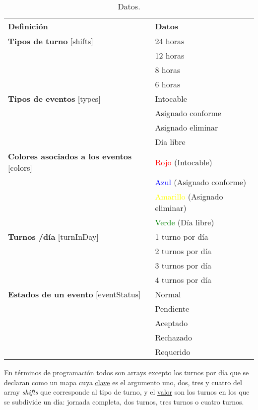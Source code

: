 \begin{itemize}
	\begin{table}[htbp]
\begin{center}
\begin{tabular}{|l|l|}
\hline
Definición & Datos  \\
\hline \hline
\textbf{Tipos de turno} [shifts] &  24 horas \\ \hline
 &  12 horas \\ \hline
 &  8 horas\\ \hline
 &  6 horas\\ \hline
  \textbf{Tipos de eventos}  [types] & Intocable \\ \hline
 &  Asignado conforme \\ \hline
 &  Asignado eliminar \\ \hline
 &  Día libre\\ \hline
  \textbf{Colores asociados a los eventos} [colors] & \textcolor{red}{Rojo} \small{(Intocable)} \\ \hline
 &  \textcolor{blue}{Azul} \small{(Asignado conforme)} \\ \hline
 &  \textcolor{yellow}{Amarillo} \small{(Asignado eliminar)} \\ \hline
 &  \textcolor{green}{Verde} \small{(Día libre)} \\ \hline
  \textbf{Turnos /día} [turnInDay] & 1 turno por día \\ \hline
 & 2 turnos por día  \\ \hline
 & 3 turnos por día  \\ \hline
 & 4 turnos por día  \\ \hline
   \textbf{Estados de un evento} [eventStatus] & Normal \\ \hline
 & Pendiente  \\ \hline
 & Aceptado   \\ \hline
 & Rechazado  \\ \hline
  & Requerido  \\ \hline
\end{tabular}
\caption{Datos.}
\label{tabla:sencilla}
\end{center}
\end{table}

En términos de programación todos son arrays excepto los turnos por día que se declaran como un mapa cuya \underline{clave} es el argumento uno, dos, tres y cuatro del array \emph{shifts} que corresponde al tipo de turno, y el \underline{valor} son los turnos en los que se subdivide un día: jornada completa, dos turnos, tres turnos o cuatro turnos.


\end{itemize}
